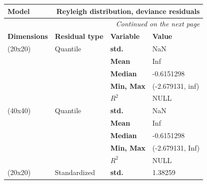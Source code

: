 \documentclass[12pt,a4paper,twoside]{article}
\begin{document}
\begin{longtable}{l|p{}|p{}|p{}}
    \textbf{Model}      & \multicolumn{3}{r}{Reyleigh distribution, deviance residuals}                                             \\
    \hline
    \endhead
    \hline
    \multicolumn{4}{r}{\emph{Continued on the next page}}                                                                           \\
    \endfoot
    \hline
    \endlastfoot
    \hline
    \textbf{Dimensions} & \textbf{Residual type}                                        & \textbf{Variable} & \textbf{Value}        \\
    (20x20)             & Quantile                                                      & \textbf{std.}     & NaN                   \\
                        &                                                               & \textbf{Mean}     & Inf                   \\
                        &                                                               & \textbf{Median}   & -0.6151298            \\
                        &                                                               & \textbf{Min, Max} & (-2.679131, inf)      \\
                        &                                                               & \textbf{$R^2$}    & NULL                  \\
    \hline
    (40x40)             & Quantile                                                      & \textbf{std.}     & NaN                   \\
                        &                                                               & \textbf{Mean}     & Inf                   \\
                        &                                                               & \textbf{Median}   & -0.6151298            \\
                        &                                                               & \textbf{Min, Max} & (-2.679131, Inf)      \\
                        &                                                               & \textbf{$R^2$}    & NULL                  \\
    \hline
    (20x20)             & Standardized                                                  & \textbf{std.}     & 1.38259               \\

\end{longtable}
\end{document}
